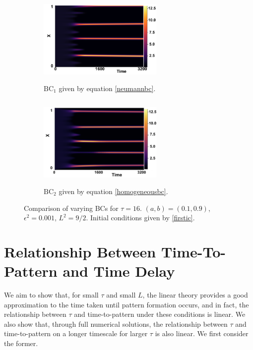 \begin{figure}[H]
    \centering
    \begin{subfigure}[t]{0.45\textwidth}
        \centering
        \includegraphics[width=6cm,height=4.5cm]{ic216.png}
        \caption{$\text{BC}_1$ given by equation \eqref{neumannbc}.}
        \label{}
    \end{subfigure}
    \hfill
    \begin{subfigure}[t]{0.45\textwidth}
        \centering
        \includegraphics[width=6cm,height=4.5cm]{bc16.png}
        \caption{$\text{BC}_2$ given by equation \eqref{homogeneousbc}.}
        \label{}
    \end{subfigure}
    \caption{Comparison of varying BCs for $\tau=16$. $(a,b)=(0.1,0.9)$, $\epsilon^2=0.001$, $L^2=9/2$. Initial conditions given by \eqref{firstic}.}
    \label{fig:bctau3}
\end{figure}

\section{Relationship Between Time-To-Pattern and Time Delay}\label{section:delaypatt}

We aim to show that, for small $\tau$ and small $L$, the linear theory provides a good approximation to the time taken until pattern formation occurs, and in fact, the relationship between $\tau$ and time-to-pattern under these conditions is linear. We also show that, through full numerical solutions, the relationship between $\tau$ and time-to-pattern on a longer timescale for larger $\tau$ is also linear. We first consider the former.

